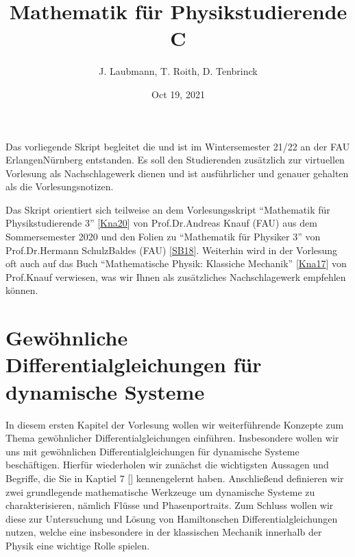 \documentclass[letterpaper,10pt,english]{jupyterBook}
\title{Mathematik für Physikstudierende C}
\date{Oct 19, 2021}
\author{J.\@{} Laubmann, T.\@{} Roith, D.\@{} Tenbrinck}
\begin{document}
\pagestyle{empty}
\sphinxmaketitle
\pagestyle{plain}
\sphinxtableofcontents
\pagestyle{normal}
\label{\detokenize{intro::doc}}


\noindent{}

Das vorliegende Skript begleitet die  und ist im Wintersemester 21/22 an der FAU Erlangen\sphinxhyphen{}Nürnberg entstanden. Es soll den Studierenden zusätzlich zur virtuellen Vorlesung als Nachschlagewerk dienen und ist ausführlicher und genauer gehalten als die Vorlesungsnotizen.

\begin{DUlineblock}{0em}
\item[] 
\end{DUlineblock}

Das Skript orientiert sich teilweise an dem Vorlesungsskript “Mathematik für Physikstudierende 3” {[}\hyperlink{cite.references:id6}{Kna20}{]} von Prof.Dr.Andreas Knauf (FAU) aus dem Sommersemester 2020 und den Folien zu “Mathematik für Physiker 3” von Prof.Dr.Hermann Schulz\sphinxhyphen{}Baldes (FAU) {[}\hyperlink{cite.references:id8}{SB18}{]}. Weiterhin wird in der Vorlesung oft auch auf das Buch “Mathematische Physik: Klassiche Mechanik” {[}\hyperlink{cite.references:id7}{Kna17}{]} von Prof.Knauf verwiesen, was wir Ihnen als zusätzliches Nachschlagewerk empfehlen können.


\chapter{Gewöhnliche Differentialgleichungen für dynamische Systeme}
\label{\detokenize{ode/ode:gewohnliche-differentialgleichungen-fur-dynamische-systeme}}\label{\detokenize{ode/ode::doc}}
In diesem ersten Kapitel der Vorlesung wollen wir weiterführende Konzepte zum Thema gewöhnlicher Differentialgleichungen einführen.
Insbesondere wollen wir uns mit gewöhnlichen Differentialgleichungen für dynamische Systeme beschäftigen.
Hierfür wiederholen wir zunächst die wichtigsten Aussagen und Begriffe, die Sie in Kaptiel 7 {[}{]} kennengelernt haben.
Anschließend definieren wir zwei grundlegende mathematische Werkzeuge um dynamische Systeme zu charakterisieren, nämlich Flüsse und Phasenportraits.
Zum Schluss wollen wir diese zur Untersuchung und Lösung von Hamiltonschen Differentialgleichungen nutzen, welche eine insbesondere in der klassischen Mechanik innerhalb der Physik eine wichtige Rolle spielen.
\end{document}
